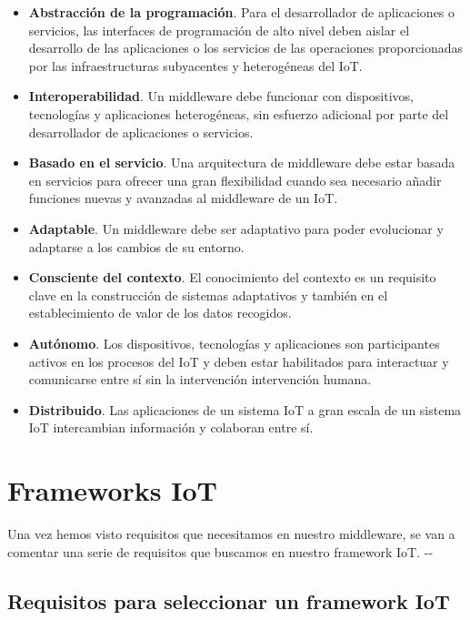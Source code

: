 \begin{itemize}
    \item \textbf{Abstracción de la programación}. Para el desarrollador de aplicaciones o servicios, las interfaces de programación de alto nivel deben aislar el desarrollo de las aplicaciones o los servicios de las operaciones proporcionadas por las infraestructuras subyacentes y heterogéneas del IoT. 
    \item \textbf{Interoperabilidad}. Un middleware debe funcionar con dispositivos, tecnologías y aplicaciones heterogéneas, sin esfuerzo adicional por parte del desarrollador de aplicaciones o servicios.
    \item \textbf{Basado en el servicio}. Una arquitectura de middleware debe estar basada en servicios para ofrecer una gran flexibilidad cuando sea necesario añadir funciones nuevas y avanzadas al middleware de un IoT.
    \item \textbf{Adaptable}. Un middleware debe ser adaptativo para poder evolucionar y adaptarse a los cambios de su entorno.
    \item \textbf{Consciente del contexto}. El conocimiento del contexto es un requisito clave en la construcción de sistemas adaptativos y también en el establecimiento de valor de los datos recogidos.
    \item \textbf{Autónomo}. Los dispositivos, tecnologías y aplicaciones son participantes activos en los procesos del IoT y deben estar habilitados para interactuar y comunicarse entre sí sin la intervención intervención humana.
    \item \textbf{Distribuido}.  Las aplicaciones de un sistema IoT a gran escala de un sistema IoT intercambian información y colaboran entre sí.
\end{itemize}


\section{Frameworks IoT}

Una vez hemos visto requisitos que necesitamos en nuestro middleware, se van a comentar una serie de requisitos que buscamos en nuestro framework IoT. \cite{agarwal2020investigating}-\cite{dumitru2017iot}-\cite{nakhuva2015study}

\subsection{Requisitos para seleccionar un framework IoT} \label{requisitosFramework}

